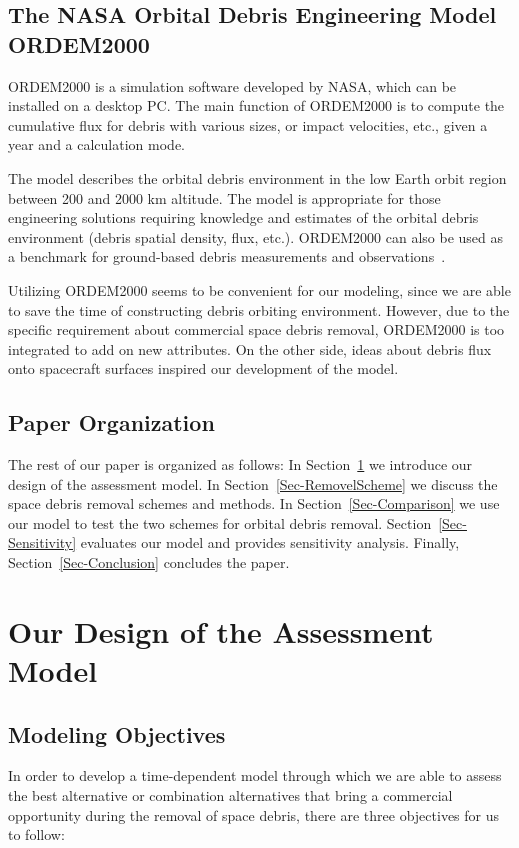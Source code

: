 \documentclass{mcmthesis}
\begin{document}
	\subsection{The NASA Orbital Debris Engineering Model ORDEM2000}
	
	ORDEM2000 is a simulation software developed by NASA, which can be installed on a desktop PC. The main function of ORDEM2000 is to compute the cumulative flux for debris with various sizes, or impact velocities, etc., given a year and a calculation mode.
	
	The model describes the orbital debris environment in the low Earth orbit region between 200 and 2000 km altitude. The model is appropriate for those engineering solutions requiring knowledge and estimates of the orbital debris environment (debris spatial density, flux, etc.). ORDEM2000 can also be used as a benchmark for ground-based debris measurements and observations~\cite{ORDEM}.
	
	Utilizing ORDEM2000 seems to be convenient for our modeling, since we are able to save the time of constructing debris orbiting environment. However, due to the specific requirement about commercial space debris removal, ORDEM2000 is too integrated to add on new attributes. On the other side, ideas about debris flux onto spacecraft surfaces inspired our development of the model.

\subsection{Paper Organization}

The rest of our paper is organized as follows: In Section~\ref{Sec-Design} we introduce our design of the assessment model. In Section~\ref{Sec-RemovelScheme} we discuss the space debris removal schemes and methods. In Section~\ref{Sec-Comparison} we use our model to test the two schemes for orbital debris removal. Section~\ref{Sec-Sensitivity} evaluates our model and provides sensitivity analysis. Finally, Section~\ref{Sec-Conclusion} concludes the paper.


\section{Our Design of the Assessment Model} \label{Sec-Design}
\subsection{Modeling Objectives}
	In order to develop a time-dependent model through which we are able to assess the best alternative or combination alternatives that bring a commercial opportunity during the removal of space debris, there are three objectives for us to follow:
	
\end{document}
